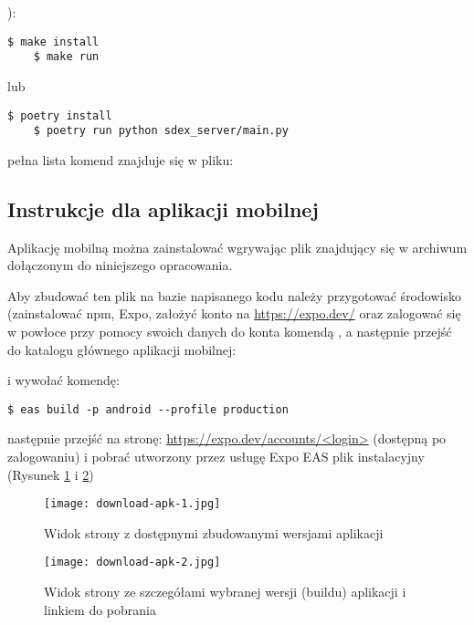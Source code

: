 \documentclass[../main.tex]{subfiles}
\begin{document}
):

\begin{lstlisting}[style=BashInputStyle]
    $ make install
    $ make run
\end{lstlisting}
lub
\begin{lstlisting}[style=BashInputStyle]
    $ poetry install
    $ poetry run python sdex_server/main.py
\end{lstlisting}

pełna lista komend znajduje się w pliku:



\subsection{Instrukcje dla aplikacji mobilnej}

Aplikację mobilną można zainstalować wgrywając plik  znajdujący się w archiwum dołączonym do niniejszego opracowania.

Aby zbudować  ten plik na bazie napisanego kodu należy przygotować środowisko (zainstalować npm, Expo, założyć konto na \url{https://expo.dev/} oraz zalogować się w powłoce przy pomocy swoich danych do konta komendą , a następnie przejść do katalogu głównego aplikacji mobilnej:

 i wywołać komendę:

\begin{lstlisting}[style=BashInputStyle]
    $ eas build -p android --profile production
\end{lstlisting}

następnie przejść na stronę: \url{https://expo.dev/accounts/<login>} (dostępną po zalogowaniu) i pobrać utworzony przez usługę Expo EAS plik instalacyjny  (Rysunek \ref{fig:builds-list} i \ref{fig:download-build})

\begin{figure}[H]
	\centering
	\texttt{[image: download-apk-1.jpg]}
	\caption{Widok strony z dostępnymi zbudowanymi wersjami aplikacji}
	\label{fig:builds-list}
\end{figure}

\begin{figure}[H]
	\centering
	\texttt{[image: download-apk-2.jpg]}
    \captionsetup{justification=centering}
	\caption{Widok strony ze szczegółami wybranej wersji (buildu) aplikacji i linkiem do pobrania}
	\label{fig:download-build}
\end{figure}
\end{document}
